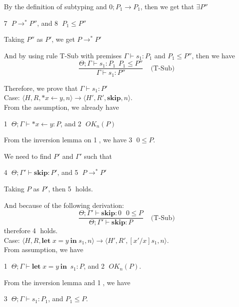 \documentclass[english]{jssst_ppl} %
\newcommand\LET{\mathbf{let}\;}
\newcommand\IN{\mathbf{in}\;}
\newcommand\SKIP{\mathbf{skip}}
\newcommand\Rtab{\; \; \; \;}
\theoremstyle{definition}
\begin{document}
By the definition of subtyping and $0;P_{1} \rightarrow P_{1}$, then we get that $\exists P''$
\begin{center}
 \textcircled{7} $P \rightarrow^{*} P''$, and \textcircled{8} $P_{1} \le P''$
\end{center}

Taking $P''$ as  $P'$, we get $P \rightarrow^{*} P'$

And by using rule T-Sub with premises $\Gamma \vdash s_{1} : P_{1}$ and $P_{1} \le P''$, then we have 
$$
    \frac{\Theta; \Gamma \vdash s_{1} : P_{1} \  \  P_{1} \le P''}
    {\Gamma \vdash s_{1} : P''}
    \Rtab \mbox{(T-Sub)}
$$

Therefore, we prove that $\Gamma \vdash s_{1} : P'$ \\

\noindent Case: $\langle H, R, *x \leftarrow y , n \rangle \rightarrow  \langle H', R', \SKIP, n  \rangle $. \\

From the assumption, we already have
\begin{center}
\textcircled{1} $\Theta; \Gamma \vdash *x \leftarrow y : P$, and \textcircled{2} $OK_{n}(P)$
\end{center}

From the inversion lemma on \textcircled{1}, we have \textcircled{3} $0 \le P$.

We need to find $P'$ and $\Gamma'$ such that
\begin{center}
 \textcircled{4} $\Theta; \Gamma' \vdash \SKIP: P'$, and \textcircled{5} $P \rightarrow^{*} P'$
\end{center}

Taking $P$ as $P'$, then \textcircled{5} holds.

And because of the following derivation:
$$
  \frac{\Theta; \Gamma' \vdash \SKIP: 0 \ \ \ 0 \le P}
   {\Theta;\Gamma' \vdash \SKIP : P}
  \Rtab \mbox{(T-Sub)}
$$
therefore \textcircled{4} holds. \\

\noindent Case: $\langle H, R, \LET x = y\  \IN s_{1} , n \rangle \rightarrow  \langle H', R', [x'/x]s_{1}, n  \rangle $. \\

From assumption, we have 
\begin{center}
\textcircled{1} $\Theta; \Gamma \vdash \LET x = y\  \IN \  s_{1} : P$, and \textcircled{2} $OK_{n}(P)$.
\end{center}

From the inversion lemma and \textcircled{1}, we have 
\begin{center}
\textcircled{3} $\Theta; \Gamma \vdash s_{1} : P_{1}$, and $P_{1} \le P$.
\end{center}
\end{document}
